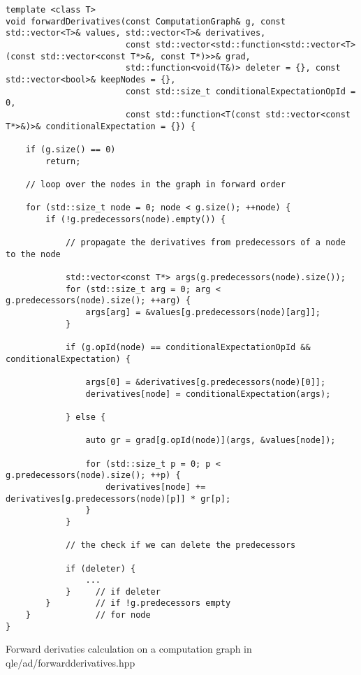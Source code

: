 \begin{listing}
\begin{verbatim}
template <class T>
void forwardDerivatives(const ComputationGraph& g, const std::vector<T>& values, std::vector<T>& derivatives,
                        const std::vector<std::function<std::vector<T>(const std::vector<const T*>&, const T*)>>& grad,
                        std::function<void(T&)> deleter = {}, const std::vector<bool>& keepNodes = {},
                        const std::size_t conditionalExpectationOpId = 0,
                        const std::function<T(const std::vector<const T*>&)>& conditionalExpectation = {}) {

    if (g.size() == 0)
        return;

    // loop over the nodes in the graph in forward order

    for (std::size_t node = 0; node < g.size(); ++node) {
        if (!g.predecessors(node).empty()) {

            // propagate the derivatives from predecessors of a node to the node

            std::vector<const T*> args(g.predecessors(node).size());
            for (std::size_t arg = 0; arg < g.predecessors(node).size(); ++arg) {
                args[arg] = &values[g.predecessors(node)[arg]];
            }

            if (g.opId(node) == conditionalExpectationOpId && conditionalExpectation) {

                args[0] = &derivatives[g.predecessors(node)[0]];
                derivatives[node] = conditionalExpectation(args);

            } else {

                auto gr = grad[g.opId(node)](args, &values[node]);

                for (std::size_t p = 0; p < g.predecessors(node).size(); ++p) {
                    derivatives[node] += derivatives[g.predecessors(node)[p]] * gr[p];
                }
            }

            // the check if we can delete the predecessors

            if (deleter) {
                ...
            }     // if deleter
        }         // if !g.predecessors empty
    }             // for node
}
\end{verbatim}
\caption{Forward derivaties calculation on a computation graph in qle/ad/forwardderivatives.hpp}
\label{lst:forwardderivatives}
\end{listing}

